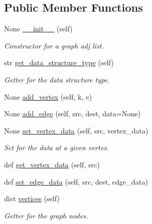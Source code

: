 \subsection*{Public Member Functions}
\begin{DoxyCompactItemize}
\item 
None \mbox{\hyperlink{classbridges_1_1graph__adj__list_1_1_graph_adj_list_ace583fede9dccbdc0360da581c7a6194}{\+\_\+\+\_\+init\+\_\+\+\_\+}} (self)
\begin{DoxyCompactList}\small\item\em Constructor for a graph adj list. \end{DoxyCompactList}\item 
str \mbox{\hyperlink{classbridges_1_1graph__adj__list_1_1_graph_adj_list_aa0f87a1d6d70271b27449cee00c0c9f6}{get\+\_\+data\+\_\+structure\+\_\+type}} (self)
\begin{DoxyCompactList}\small\item\em Getter for the data structure type. \end{DoxyCompactList}\item 
None \mbox{\hyperlink{classbridges_1_1graph__adj__list_1_1_graph_adj_list_a334ca9aedea2698a3923e4add6d84357}{add\+\_\+vertex}} (self, k, e)
\item 
None \mbox{\hyperlink{classbridges_1_1graph__adj__list_1_1_graph_adj_list_acf1239ff620f6389ce8dfe83c960a227}{add\+\_\+edge}} (self, src, dest, data=None)
\item 
None \mbox{\hyperlink{classbridges_1_1graph__adj__list_1_1_graph_adj_list_a56bb84b11590553d8cc27692294c6096}{set\+\_\+vertex\+\_\+data}} (self, src, vertex\+\_\+data)
\begin{DoxyCompactList}\small\item\em Set for the data at a given vertex. \end{DoxyCompactList}\item 
def \mbox{\hyperlink{classbridges_1_1graph__adj__list_1_1_graph_adj_list_a0523e2e842042c131dcbe4fd66a6a296}{get\+\_\+vertex\+\_\+data}} (self, src)
\item 
def \mbox{\hyperlink{classbridges_1_1graph__adj__list_1_1_graph_adj_list_aa1b179f2d1ded0135afa792278f3a500}{set\+\_\+edge\+\_\+data}} (self, src, dest, edge\+\_\+data)
\item 
dict \mbox{\hyperlink{classbridges_1_1graph__adj__list_1_1_graph_adj_list_afee0fb35ddd234d9c52998d0d62e1a5c}{vertices}} (self)
\begin{DoxyCompactList}\small\item\em Getter for the graph nodes. \end{DoxyCompactList}\item 

\end{DoxyCompactItemize}
